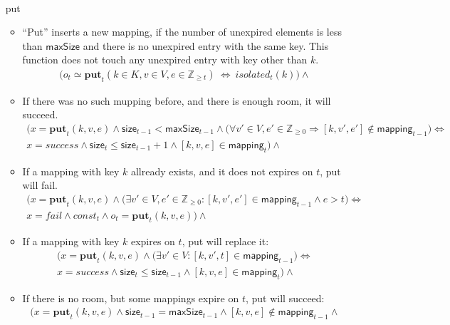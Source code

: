\documentclass{article}
\renewcommand{\o}[1]{\ensuremath{\mathbf{#1}}}
\newcommand{\p}[1]{\ensuremath{\mathit{#1}}}
\newcommand{\s}[1]{\ensuremath{\mathsf{#1}}}
\newcommand{\nintset}{\ensuremath{\mathds{Z}_{\ge 0}}}
\newcommand{\moreset}[1]{\ensuremath{\mathds{Z}_{\ge #1}}}
\begin{document}
\begin{itemize}
\begin{itemize}
\begin{gather}
      \label{eq:erase2}
    \end{gather}
  \end{itemize}
\item[put]
  \begin{itemize}
  \item ``Put'' inserts a new mapping, if the number of unexpired elements is less than \s{maxSize} and there is no unexpired entry with the same key.
    This function does not touch any unexpired entry with key other than $k$.
    \begin{gather*}
      \Big(o_t \simeq \o{put}_t(k\in K, v\in V, e\in \moreset{t}) ~\Leftrightarrow~ \p{isolated}_t(k)\Big) \wedge
    \end{gather*}
  \item If there was no such mupping before, and there is enough room, it will succeed.
    \begin{gather}
      \Big(x=\o{put}_t(k, v, e) \wedge \s{size}_{t-1} < \s{maxSize}_{t-1} \wedge \big(\forall v'\in V, e'\in \nintset \Rightarrow [k, v', e'] \not\in \s{mapping}_{t-1}\big) \Leftrightarrow \nonumber\\
      x=success \wedge \s{size}_t \le \s{size}_{t-1}+1 \wedge [k, v, e] \in \s{mapping}_t\Big)\wedge
      \label{eq:put1}
    \end{gather}
  \item If a mapping with key $k$ allready exists, and it does not expires on $t$, put will fail.
    \begin{gather}
      \Big(x=\o{put}_t(k, v, e) \wedge \big(\exists v'\in V, e'\in \nintset: [k, v', e']\in \s{mapping}_{t-1} \wedge e > t\big) \Leftrightarrow\nonumber\\
      x=fail \wedge \p{const}_t \wedge o_t = \o{put}_t(k,v,e)\Big)\wedge
      \label{eq:put2}
    \end{gather}
  \item If a mapping with key $k$ expires on $t$, put will replace it:
    \begin{gather}
      \Big(x=\o{put}_t(k, v, e) \wedge \big(\exists v'\in V: [k, v', t]\in \s{mapping}_{t-1}\big) \Leftrightarrow\nonumber\\
      x=success \wedge \s{size}_t \le \s{size}_{t-1} \wedge [k, v, e] \in \s{mapping}_t\Big)\wedge
      \label{eq:put3}
    \end{gather}
  \item If there is no room, but some mappings expire on $t$, put will succeed:
    \begin{gather}
      \Big(x=\o{put}_t(k, v, e) \wedge \s{size}_{t-1} = \s{maxSize}_{t-1} \wedge [k, v, e] \not\in \s{mapping}_{t-1} \wedge \nonumber\\

\end{gather}
\end{itemize}
\end{itemize}
\end{document}
